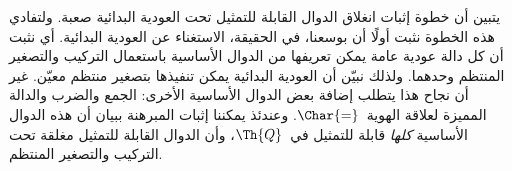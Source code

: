 \documentclass[../../../include/open-logic-section]{subfiles}
\begin{document}
يتبين أن خطوة إثبات انغلاق الدوال القابلة للتمثيل تحت العودية
البدائية صعبة. ولتفادي هذه الخطوة نثبت أولًا أن بوسعنا، في الحقيقة،
الاستغناء عن العودية البدائية. أي نثبت أن كل دالة عودية عامة يمكن
تعريفها من الدوال الأساسية باستعمال التركيب والتصغير المنتظم وحدهما.
ولذلك نبيّن أن العودية البدائية يمكن تنفيذها بتصغير منتظم معيّن. غير
أن نجاح هذا يتطلب إضافة بعض الدوال الأساسية الأخرى: الجمع والضرب
والدالة المميزة لعلاقة الهوية~$\Char{=}$. وعندئذ يمكننا إثبات المبرهنة
ببيان أن هذه الدوال الأساسية \emph{كلها} قابلة للتمثيل في~$\Th{Q}$،
وأن الدوال القابلة للتمثيل مغلقة تحت التركيب والتصغير المنتظم.
\end{document}
